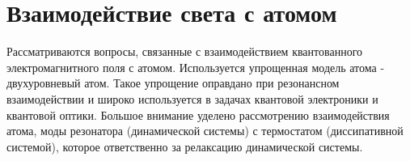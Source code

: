 \chapter{Взаимодействие света с атомом}
\label{chInteraction}

Рассматриваются вопросы, связанные с взаимодействием квантованного
электромагнитного поля с атомом. Используется упрощенная модель атома -
двухуровневый атом. Такое упрощение оправдано при резонансном
взаимодействии и широко используется в задачах квантовой электроники и
квантовой оптики. Большое внимание уделено рассмотрению
взаимодействия атома, моды резонатора (динамической системы) с
термостатом (диссипативной системой), которое ответственно за
релаксацию динамической системы.  

















